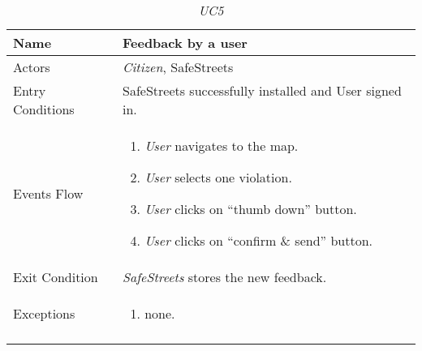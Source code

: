 \documentclass[../../../RASD.tex]{subfiles}
\begin{document}
    \begin{center}
        \begin{longtable}{| p{.35\linewidth} | p{.65\linewidth} |}
            \hline
            \textbf{Name} & \textbf{Feedback by a user}\\ \hline
            Actors & \textit{Citizen}, SafeStreets\\ \hline
            Entry Conditions & SafeStreets successfully installed and User signed in.\\ \hline
            Events Flow &
            \begin{enumerate}
                \item \textit{User} navigates to the map.
                \item \textit{User} selects one violation.
                \item \textit{User} clicks on “thumb down” button.
                \item \textit{User} clicks on “confirm \& send” button.
            \end{enumerate}
            \\ \hline
            Exit Condition & \textit{SafeStreets} stores the new feedback.\\ \hline
            Exceptions &
            \begin{enumerate}
                \item none.
            \end{enumerate}
            \\
            \hline
            \caption[\textit{Use Case 5}]{\textit{UC5}}
        \end{longtable}
    \end{center}
    \newpage
\end{document}
